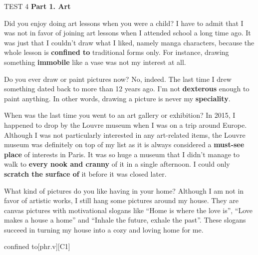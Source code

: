 \begin{glossarymc}[Cambridge 12]
    \begin{test}{TEST 4}
    \noindent
    \textbf{Part 1. Art}
    \begin{qa}{Did you enjoy doing art lessons when you were a child?}
    I have to admit that I was not in favor of joining art lessons when I attended school a long time ago. It was just that I couldn’t draw what I liked, namely manga characters, because the whole lesson is \textbf{confined to} traditional forms only. For instance, drawing something \textbf{immobile} like a vase was not my interest at all.
    \end{qa}

    \begin{qa}{Do you ever draw or paint pictures now?}
    No, indeed. The last time I drew something dated back to more than 12 years ago. I’m not \textbf{dexterous} enough to paint anything. In other words, drawing a picture is never my \textbf{speciality}.
    \end{qa}

    \begin{qa}{When was the last time you went to an art gallery or exhibition?}
    In 2015, I happened to drop by the Louvre museum when I was on a trip around Europe. Although I was not particularly interested in any art-related items, the Louvre museum was definitely on top of my list as it is always considered a \textbf{must-see place} of interests in Paris. It was so huge a museum that I didn’t manage to walk to \textbf{every nook and cranny} of it in a single afternoon. I could only \textbf{scratch the surface of} it before it was closed later.
    \end{qa}

    \begin{qa}{What kind of pictures do you like having in your home?}
    Although I am not in favor of artistic works, I still hang some pictures around my house. They are canvas pictures with motivational slogans like “Home is where the love is”, “Love makes a house a home” and “Inhale the future, exhale the past”. These slogans succeed in turning my house into a cozy and loving home for me.
    \end{qa}

        \begin{VocabExplain}[Part 1]
            \begin{ExplainCard}{confined to}[phr.v][C1]
            \end{ExplainCard}


\end{VocabExplain}
\end{test}
\end{glossarymc}
